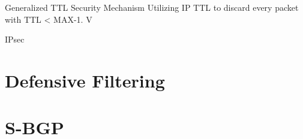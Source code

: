 \documentclass[notes=hide,yellow]{beamer}
\begin{document}
\begin{frame}{Generalized TTL Security Mechanism}
	Utilizing IP TTL to discard every packet with TTL < MAX-1.
	V%
\end{frame}

\begin{frame}{IPsec}
\end{frame}

\section{Defensive Filtering}
\subsection*{}
%
%
%
%
%
%
%
\section{S-BGP}
\subsection*{}
\end{document}
